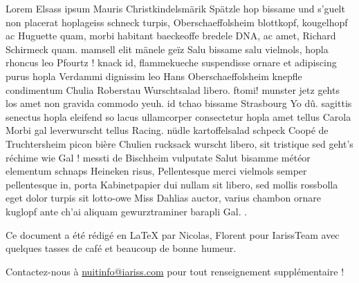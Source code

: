 \documentclass[12pt, a4paper]{article}
\newcommand{\espace}{\vspace{.8cm}}
\newcommand{\authors}{Nicolas, Florent}
\begin{document}
\espace{}
Lorem Elsass ipsum Mauris Christkindelsmärik Spätzle hop bissame und s'guelt non placerat hoplageiss schneck turpis, Oberschaeffolsheim blottkopf, kougelhopf ac Huguette quam, morbi habitant baeckeoffe bredele DNA, ac amet, Richard Schirmeck quam. mamsell elit mänele geïz Salu bissame salu vielmols, hopla rhoncus leo Pfourtz ! knack id, flammekueche suspendisse ornare et adipiscing purus hopla Verdammi dignissim leo Hans Oberschaeffolsheim knepfle condimentum Chulia Roberstau Wurschtsalad libero. ftomi! munster jetz gehts los amet non gravida commodo yeuh. id tchao bissame Strasbourg Yo dû. sagittis senectus hopla eleifend so lacus ullamcorper consectetur hopla amet tellus Carola Morbi gal leverwurscht tellus Racing. nüdle kartoffelsalad schpeck Coopé de Truchtersheim picon bière Chulien rucksack wurscht libero, sit tristique sed geht's réchime wie Gal ! messti de Bischheim vulputate Salut bisamme météor elementum schnaps Heineken risus, Pellentesque merci vielmols semper pellentesque in, porta Kabinetpapier dui nullam sit libero, sed mollis rossbolla eget dolor turpis sit lotto-owe Miss Dahlias auctor, varius chambon ornare kuglopf ante ch'ai aliquam gewurztraminer barapli Gal. .



\espace\vfill{}
Ce document a été rédigé en \LaTeX{} par \authors{} pour IarissTeam avec quelques tasses de café et beaucoup de bonne humeur.

Contactez-nous à \href{mailto:nuitinfo@iariss.com}{nuitinfo@iariss.com} pour tout renseignement supplémentaire !
\end{document}
